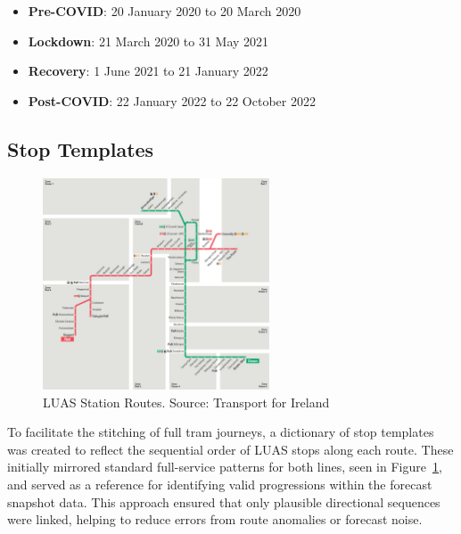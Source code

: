 \begin{itemize}
  \item \textbf{Pre-COVID}: 20 January 2020 to 20 March 2020
  \item \textbf{Lockdown}: 21 March 2020 to 31 May 2021
  \item \textbf{Recovery}: 1 June 2021 to 21 January 2022
  \item \textbf{Post-COVID}: 22 January 2022 to 22 October 2022
\end{itemize}

\subsection*{Stop Templates}

\begin{figure}[H]
  \centering
  \includegraphics[width=0.6\textwidth]{figures/paper_figures/station_map.jpg}
  \caption{LUAS Station Routes. Source: Transport for Ireland}
  \label{fig:luas_routes}
\end{figure}

    To facilitate the stitching of full tram journeys, a dictionary of stop templates was created to reflect the sequential order of LUAS stops along each route. These initially mirrored standard full-service patterns for both lines, seen in Figure~\ref{fig:luas_routes}, and served as a reference for identifying valid progressions within the forecast snapshot data. This approach ensured that only plausible directional sequences were linked, helping to reduce errors from route anomalies or forecast noise.

